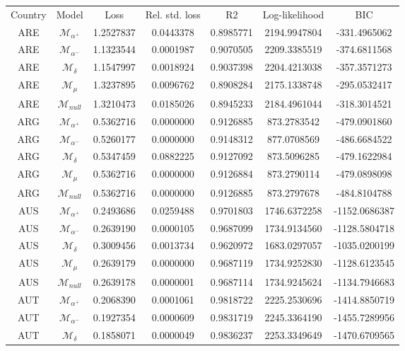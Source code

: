 \begin{tabular}{ccccccc}
Country & Model & Loss & Rel. std. loss & R2 & Log-likelihood & BIC\\
ARE & $\mathcal{M}_{\alpha^+}$ & 1.2527837 & 0.0443378 & 0.8985771 & 2194.9947804 & -331.4965062\\
ARE & $\mathcal{M}_{\alpha^-}$ & 1.1323544 & 0.0001987 & 0.9070505 & 2209.3385519 & -374.6811568\\
ARE & $\mathcal{M}_{\delta}$ & 1.1547997 & 0.0018924 & 0.9037398 & 2204.4213038 & -357.3571273\\
ARE & $\mathcal{M}_{\mu}$ & 1.3237895 & 0.0096762 & 0.8908284 & 2175.1338748 & -295.0532417\\
ARE & $\mathcal{M}_{null}$ & 1.3210473 & 0.0185026 & 0.8945233 & 2184.4961044 & -318.3014521\\
ARG & $\mathcal{M}_{\alpha^+}$ & 0.5362716 & 0.0000000 & 0.9126885 & 873.2783542 & -479.0901860\\
ARG & $\mathcal{M}_{\alpha^-}$ & 0.5260177 & 0.0000000 & 0.9148312 & 877.0708569 & -486.6684522\\
ARG & $\mathcal{M}_{\delta}$ & 0.5347459 & 0.0882225 & 0.9127092 & 873.5096285 & -479.1622984\\
ARG & $\mathcal{M}_{\mu}$ & 0.5362716 & 0.0000000 & 0.9126884 & 873.2790114 & -479.0898098\\
ARG & $\mathcal{M}_{null}$ & 0.5362716 & 0.0000000 & 0.9126885 & 873.2797678 & -484.8104788\\
AUS & $\mathcal{M}_{\alpha^+}$ & 0.2493686 & 0.0259488 & 0.9701803 & 1746.6372258 & -1152.0686387\\
AUS & $\mathcal{M}_{\alpha^-}$ & 0.2639190 & 0.0000105 & 0.9687099 & 1734.9134560 & -1128.5804718\\
AUS & $\mathcal{M}_{\delta}$ & 0.3009456 & 0.0013734 & 0.9620972 & 1683.0297057 & -1035.0200199\\
AUS & $\mathcal{M}_{\mu}$ & 0.2639179 & 0.0000000 & 0.9687119 & 1734.9252830 & -1128.6123545\\
AUS & $\mathcal{M}_{null}$ & 0.2639178 & 0.0000001 & 0.9687114 & 1734.9245624 & -1134.7946683\\
AUT & $\mathcal{M}_{\alpha^+}$ & 0.2068390 & 0.0001061 & 0.9818722 & 2225.2530696 & -1414.8850719\\
AUT & $\mathcal{M}_{\alpha^-}$ & 0.1927354 & 0.0000609 & 0.9831719 & 2245.3364190 & -1455.7289956\\
AUT & $\mathcal{M}_{\delta}$ & 0.1858071 & 0.0000049 & 0.9836237 & 2253.3349649 & -1470.6709565\\

\end{tabular}
